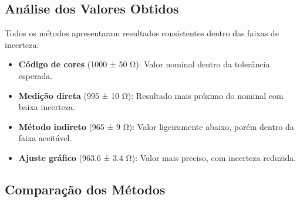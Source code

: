\documentclass[12pt]{article}
\begin{document}
\subsection*{Análise dos Valores Obtidos}
Todos os métodos apresentaram resultados consistentes dentro das faixas de incerteza:
\begin{itemize}
    \item \textbf{Código de cores} (1000 ± 50 Ω): Valor nominal dentro da tolerância esperada.
    \item \textbf{Medição direta} (995 ± 10 Ω): Resultado mais próximo do nominal com baixa incerteza.
    \item \textbf{Método indireto} (965 ± 9 Ω): Valor ligeiramente abaixo, porém dentro da faixa aceitável.
    \item \textbf{Ajuste gráfico} (963.6 ± 3.4 Ω): Valor mais preciso, com incerteza reduzida.
\end{itemize}

\subsection*{Comparação dos Métodos}
\end{document}
